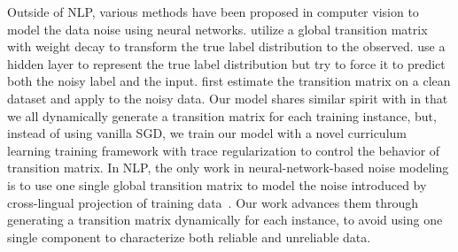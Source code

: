 
Outside of NLP, various methods have been proposed in computer vision  to 
 model the data noise using neural networks.
\cite{sukhbaatar2014training}  utilize a global transition matrix with weight decay to transform the true label distribution to 
the observed.  %
\cite{reed2014training}  use a hidden layer to represent the true label distribution but try to force it to predict both the noisy label and the input. \cite{chen2015webly,xiao2015learning} first estimate the transition matrix on a clean dataset and apply to the noisy data. 
Our model shares similar spirit with \cite{misra2016seeing} in that we all dynamically generate a transition matrix for each
training instance, but, instead of using vanilla SGD, we train our model with a novel curriculum learning training framework with trace regularization to control the behavior of transition matrix.
In NLP, the only work in neural-network-based noise modeling is to use one single global transition matrix to model the noise introduced by
cross-lingual projection of training data~\cite{fang2016learning}.
 Our work advances them through generating a transition matrix dynamically for each instance, to avoid  using one single component to characterize both reliable and unreliable data. 



